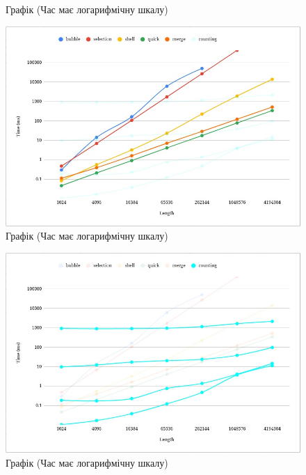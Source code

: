 \documentclass{article}
\begin{document}
\begin{normalsize}
\begin{figure}[H]
			\caption{Графік (Час має логарифмічну шкалу)}
		\end{figure}
	
		\begin{figure}[H]
			\centering
			\includegraphics[scale=0.5]{2}	
			\caption{Графік (Час має логарифмічну шкалу)}
		\end{figure}
		
		\begin{figure}[H]
			\centering
			\includegraphics[scale=0.5]{3}	
			\caption{Графік (Час має логарифмічну шкалу)}
		\end{figure}
	

\end{normalsize}
\end{document}
